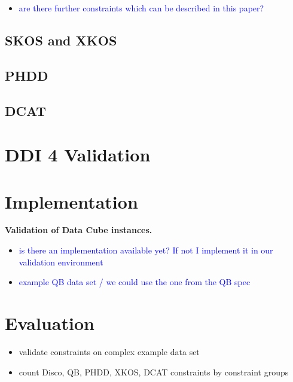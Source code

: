 \documentclass{elsart3p}    %
\begin{document}


\begin{itemize}
	\item \textcolor{blue}{are there further constraints which can be described in this paper?}
\end{itemize}

\subsection{SKOS and XKOS}

\subsection{PHDD}

\subsection{DCAT}

\section{DDI 4 Validation}

\section{Implementation}

\textbf{Validation of Data Cube instances.}
\begin{itemize}
	\item \textcolor{blue}{is there an implementation available yet? If not I implement it in our validation environment}
	\item \textcolor{blue}{example QB data set / we could use the one from the QB spec}
\end{itemize}

\section{Evaluation}

\begin{itemize}
	\item validate constraints on complex example data set
	\item count Disco, QB, PHDD, XKOS, DCAT constraints by constraint groups 
\end{itemize}
\end{document}
